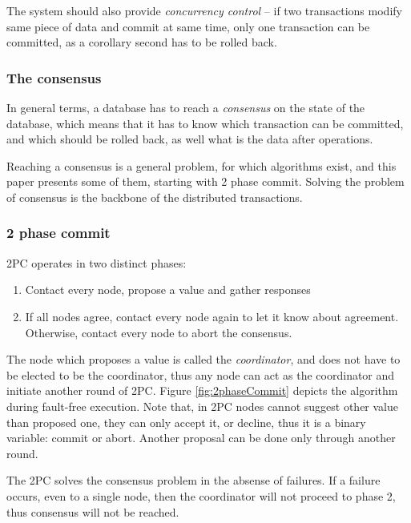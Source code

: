 The system should also provide \emph{concurrency control} -- if two transactions modify same piece of data and commit at same time, only one transaction can be committed, as a corollary second has to be rolled back.


\subsubsection{The consensus}
In general terms, a database has to reach a \emph{consensus} on the state of the database, which means that it has to know which transaction can be committed, and which should be rolled back, as well what is the data after operations.

Reaching a consensus is a general problem, for which algorithms exist, and this paper presents some of them, starting with 2 phase commit. 
Solving the problem of consensus is the backbone of the distributed transactions. 

\subsubsection{2 phase commit}
2PC \cite{2phaseC}  operates in two distinct phases:
\begin{enumerate}
\item Contact every node, propose a value and gather responses
\item If all nodes agree, contact every node again to let it know about agreement. Otherwise, contact every node to abort the consensus.
\end{enumerate}

The node which proposes a value is called the \emph{coordinator}, and does not have to be elected to be the coordinator, thus any node can act as the coordinator and initiate another round of 2PC. Figure \ref{fig:2phaseCommit} depicts the algorithm during fault-free execution. Note that, in 2PC nodes cannot suggest other value than proposed one, they can only accept it, or decline, thus it is a binary variable: commit or abort. Another proposal can be done only through another round.

The 2PC solves the consensus problem in the absense of failures. If a failure occurs, even to a single node, then the coordinator will not proceed to phase 2, thus consensus will not be reached.

